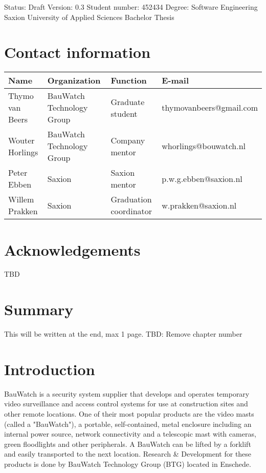 \begin{titlepage} 
\maketitle
\vspace*{\fill}
Status: Draft
Version: 0.3
Student number: 452434
Degree: Software Engineering
Saxion University of Applied Sciences
Bachelor Thesis
\thispagestyle{empty}
\end{titlepage}

\chapter{Contact information}
\begin{center}
\begin{tabular}{ | m{8em} | m{8em} | m{8em} | m{11.1em} | }
\hline
\textbf{Name} & \textbf{Organization} & \textbf{Function} & \textbf{E-mail}
\\ \hline
Thymo van Beers & BauWatch Technology Group & Graduate student & thymovanbeers@gmail.com
\\ \hline
Wouter Horlings & BauWatch Technology Group & Company mentor & whorlings@bouwatch.nl
\\ \hline
Peter Ebben & Saxion & Saxion mentor & p.w.g.ebben@saxion.nl
\\ \hline
Willem Prakken & Saxion & Graduation coordinator & w.prakken@saxion.nl
\\ \hline
\end{tabular}
\end{center}
\chapter{Acknowledgements}
TBD
\thispagestyle{empty}
\chapter{Summary}
This will be written at the end, max 1 page.
TBD: Remove chapter number
\thispagestyle{empty}

\thispagestyle{empty}
\tableofcontents
\thispagestyle{empty}

\chapter{Introduction}
BauWatch is a security system supplier that develops and operates temporary video surveillance and access control systems for use at construction sites and other remote locations.
One of their most popular products are the video masts (called a "BauWatch"), a portable, self-contained, metal enclosure including an internal
power source, network connectivity and a telescopic mast with cameras, green floodlights and other peripherals. A BauWatch can be lifted by a forklift and
easily transported to the next location. Research \& Development for these products is done by BauWatch Technology Group (BTG) located in Enschede.

